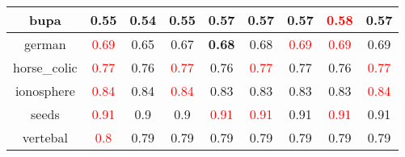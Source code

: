 \documentclass{article}%
\begin{document}
\begin{tabular}{c|cccccccc}
\hline%
bupa&\textbf{0.55}&0.54&0.55&\textbf{0.57}&0.57&0.57&\textcolor{red}{ 
0.58
}&0.57\\%
\hline%
german&\textcolor{red}{ 
0.69
}&0.65&0.67&\textbf{0.68}&0.68&\textcolor{red}{ 
0.69
}&\textcolor{red}{ 
0.69
}&0.69\\%
\hline%
horse\_colic&\textcolor{red}{ 
0.77
}&0.76&\textcolor{red}{ 
0.77
}&0.76&\textcolor{red}{ 
0.77
}&0.77&0.76&\textcolor{red}{ 
0.77
}\\%
\hline%
ionosphere&\textcolor{red}{ 
0.84
}&0.84&\textcolor{red}{ 
0.84
}&0.83&0.83&0.83&0.83&\textcolor{red}{ 
0.84
}\\%
\hline%
seeds&\textcolor{red}{ 
0.91
}&0.9&0.9&\textcolor{red}{ 
0.91
}&\textcolor{red}{ 
0.91
}&0.91&\textcolor{red}{ 
0.91
}&0.91\\%
\hline%
vertebal&\textcolor{red}{ 
0.8
}&0.79&0.79&0.79&0.79&0.79&0.79&0.79\\%
\hline%
\end{tabular}

%
\end{document}
